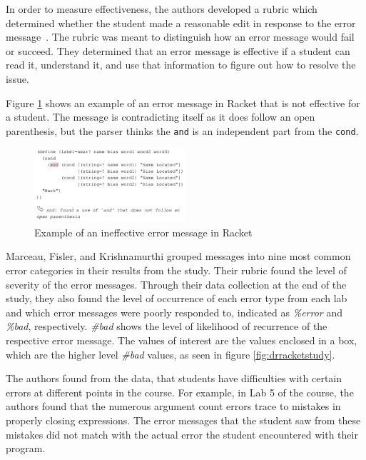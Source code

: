 \documentclass{sig-alternate}
\begin{document}
In order to measure effectiveness, the authors developed a rubric which determined whether the student made a reasonable edit in response to the error message~\cite{Marceau:2011:MEE:1953163.1953308}.
The rubric was meant to distinguish how an error message would fail or succeed.
They determined that an error message is effective if a student can read it, understand it, and use that information to figure out how to resolve the issue. 

Figure \ref{fig:racketerrormessage} shows an example of an error message in Racket that is not effective for a student.
The message is contradicting itself as it does follow an open parenthesis, but the parser thinks the \texttt{and} is an independent part from the \texttt{cond}.

\begin{figure}[t!]
  \centering
  \includegraphics[keepaspectratio, width=0.5\textwidth]{MEE_example.png}
  \caption{Example of an ineffective error message in Racket}
  \label{fig:racketerrormessage}
\end{figure}

Marceau, Fisler, and Krishnamurthi grouped messages into nine most common error categories in their results from the study.
Their rubric found the level of severity of the error messages.
Through their data collection at the end of the study, they also found the level of occurrence of each error type from each lab and which error messages were poorly responded to, indicated as \textit{\%error} and \textit{\%bad}, respectively.
\textit{\#bad} shows the level of likelihood of recurrence of the respective error message.
The values of interest are the values enclosed in a box, which are the higher level \textit{\#bad} values, as seen in figure \ref{fig:drracketstudy}. 

The authors found from the data, that students have difficulties with certain errors at different points in the course.
For example, in Lab 5 of the course, the authors found that the numerous argument count errors trace to mistakes in properly closing expressions.
The error messages that the student saw from these mistakes did not match with the actual error the student encountered with their program. 
\end{document}
